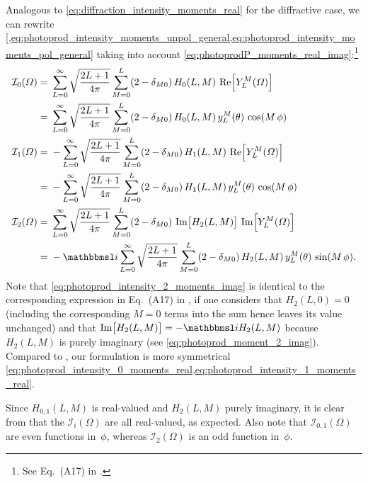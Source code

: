 Analogous to \cref{eq:diffraction_intensity_moments_real} for the
diffractive case, we can rewrite
\cref{,eq:photoprod_intensity_moments_unpol_general,eq:photoprod_intensity_moments_pol_general}
taking into account
\cref{eq:photoprodP_moments_real_imag}:\footnote{See Eq.~(A17) in
.}
\begin{align}
  \mathcal{I}_0(\Omega)
  ={}& \sum_{L = 0}^\infty \sqrt{\frac{2 L + 1}{4 \pi}} \sum_{M = 0}^{L} (2 - \delta_{M 0})\, H_0(L, M)\, \Re{Y_L^M(\Omega)} \notag
  \\
  \label{eq:photoprod_intensity_0_moments_real}
  ={}& \sum_{L = 0}^\infty \sqrt{\frac{2 L + 1}{4 \pi}} \sum_{M = 0}^{L} (2 - \delta_{M 0})\, H_0(L, M)\, y_L^M(\theta)\, \cos(M\, \phi)
  \\
  \mathcal{I}_1(\Omega)
  ={}& -\sum_{L = 0}^\infty \sqrt{\frac{2 L + 1}{4 \pi}} \sum_{M = 0}^{L} (2 - \delta_{M 0})\, H_1(L, M)\, \Re{Y_L^M(\Omega)} \notag
  \\
  \label{eq:photoprod_intensity_1_moments_real}
  ={}& -\sum_{L = 0}^\infty \sqrt{\frac{2 L + 1}{4 \pi}} \sum_{M = 0}^{L} (2 - \delta_{M 0})\, H_1(L, M)\, y_L^M(\theta)\, \cos(M\, \phi)
  \\
  \mathcal{I}_2(\Omega)
  ={}& \sum_{L = 0}^\infty \sqrt{\frac{2 L + 1}{4 \pi}} \sum_{M = 0}^{L} (2 - \delta_{M 0})\, \Im{H_2(L, M)}\, \Im{Y_L^M(\Omega)} \notag
  \\
  \label{eq:photoprod_intensity_2_moments_imag}
  ={}& -\imag \sum_{L = 0}^\infty \sqrt{\frac{2 L + 1}{4 \pi}} \sum_{M = 0}^{L} (2 - \delta_{M 0})\, H_2(L, M)\, y_L^M(\theta)\, \sin(M\, \phi).
\end{align}
Note that \cref{eq:photoprod_intensity_2_moments_imag} is identical to
the corresponding expression in Eq.~(A17) in
, if one considers that $H_2(L, 0) = 0$
(including the corresponding $M = 0$ terms into the sum hence leaves
its value unchanged) and that $\Im{H_2(L, M)} = -\imag H_2(L, M)$
because $H_2(L, M)$ is purely imaginary (see
\cref{eq:photoprod_moment_2_imag}).  Compared to
, our formulation is more symmetrical \wrt
\cref{eq:photoprod_intensity_0_moments_real,eq:photoprod_intensity_1_moments_real}.

Since $H_{0, 1}(L, M)$ is real-valued and $H_2(L, M)$ purely
imaginary, it is clear from
that the $\mathcal{I}_i(\Omega)$ are all real-valued, as expected.
Also note that $\mathcal{I}_{0, 1}(\Omega)$ are even functions
in~$\phi$, whereas $\mathcal{I}_2(\Omega)$ is an odd function
in~$\phi$.


